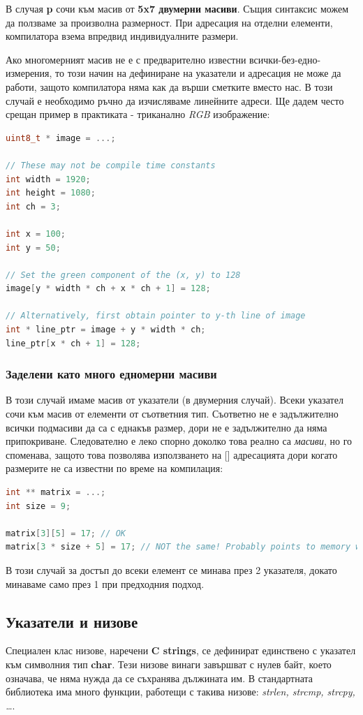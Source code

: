 \documentclass[fleqn,12pt]{article}
\begin{document}
В случая \textbf{p} сочи към масив от \textbf{5x7 двумерни масиви}. Същия синтаксис можем да ползваме за произволна размерност.
При адресация на отделни елементи, компилатора взема впредвид индивидуалните размери.

Ако многомерният масив не е с предварително известни всички-без-едно-измерения, то този начин на дефиниране на указатели и адресация
не може да работи, защото компилатора няма как да върши сметките вместо нас. В този случай е необходимо ръчно да изчисляваме линейните адреси.
Ще дадем често срещан пример в практиката - триканално \textit{RGB} изображение:
\begin{lstlisting}[language=C++, caption=Multidimensional pointers]
uint8_t * image = ...;

// These may not be compile time constants
int width = 1920;
int height = 1080;
int ch = 3;

int x = 100;
int y = 50;

// Set the green component of the (x, y) to 128
image[y * width * ch + x * ch + 1] = 128;

// Alternatively, first obtain pointer to y-th line of image
int * line_ptr = image + y * width * ch;
line_ptr[x * ch + 1] = 128;
\end{lstlisting}

\subsubsection{Заделени като много едномерни масиви}
В този случай имаме масив от указатели (в двумерния случай). Всеки указател сочи към масив от елементи от съответния тип.
Съответно не е задължително всички подмасиви да са с еднакъв размер, дори не е задължително да няма припокриване.
Следователно е леко спорно доколко това реално са \textit{масиви}, но го споменава, защото това позволява използването
на [] адресацията дори когато размерите не са известни по време на компилация:

\begin{lstlisting}[language=C++, caption=Multidimensional pointers 2]
int ** matrix = ...;
int size = 9;

matrix[3][5] = 17; // OK
matrix[3 * size + 5] = 17; // NOT the same! Probably points to memory we shouldn't touch
\end{lstlisting}

В този случай за достъп до всеки елемент се минава през 2 указателя, докато минаваме само през 1 при предходния подход.

\subsection{Указатели и низове}
Специален клас низове, наречени \textbf{C strings}, се дефинират единствено с указател към символния тип \textbf{char}.
Тези низове винаги завършват с нулев байт, което означава, че няма нужда да се съхранява дължината им.
В стандартната библиотека има много функции, работещи с такива низове: \textit{strlen, strcmp, strcpy, \dots}.
\end{document}
